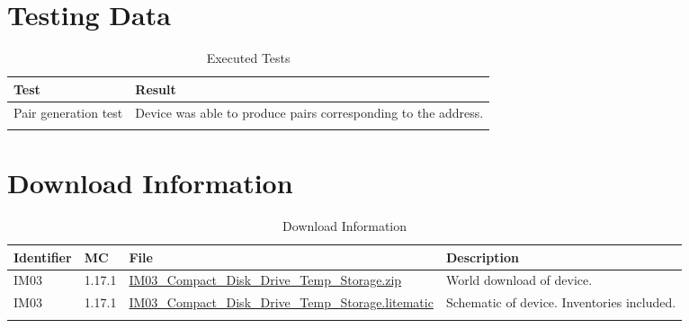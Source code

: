 \documentclass[10pt]{datasheet}
\begin{document}
\section{Testing Data}
\begin{table}[h]
\caption{Executed Tests}
\begin{tabularx}{\textwidth}{l | X}
    \thickhline
    \textbf{Test} & \textbf{Result} \\
    \hline
    Pair generation test & Device was able to produce pairs corresponding to the address. \\
    \thickhline
\end{tabularx}
\end{table}

\section{Download Information}
\begin{table}[h]
    \caption{Download Information}
    \begin{tabularx}{\textwidth}{l | l | l | X}
        \thickhline
        \textbf{Identifier} & \textbf{MC} & \textbf{File} & \textbf{Description} \\
        \hline
        IM03 & 1.17.1 & \href{https://github.com/Soontech-Annals/Archive/blob/364bde8dbcbc2e5337489ff435bcda9b387017e2/Archive/item-memory/IM03\%20Compact\%20Disk\%20Drive\%20Temp\%20Storage/IM03\_Compact\_Disk\_Drive\_Temp\_Storage.zip?raw=1}{IM03\_Compact\_Disk\_Drive\_Temp\_Storage.zip} & World download of device. \\
        \hline
        IM03 & 1.17.1 & \href{https://github.com/Soontech-Annals/Archive/blob/364bde8dbcbc2e5337489ff435bcda9b387017e2/Archive/item-memory/IM03\%20Compact\%20Disk\%20Drive\%20Temp\%20Storage/IM03\_Compact\_Disk\_Drive\_Temp\_Storage.litematic?raw=1}{IM03\_Compact\_Disk\_Drive\_Temp\_Storage.litematic} & Schematic of device. Inventories included. \\
        \hline
        \thickhline
    \end{tabularx}
\end{table}
\end{document}
